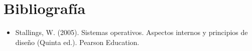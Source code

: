 \documentclass[12pt,a4paper]{article}
\begin{document}
\section {Bibliografía}
\begin{itemize}
    \item Stallings, W. (2005). Sistemas operativos. Aspectos internos y principios de diseño (Quinta ed.). Pearson Education.
\end{itemize}
\end{document}

